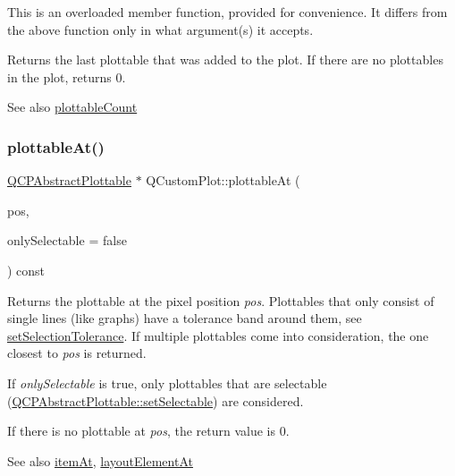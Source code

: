 This is an overloaded member function, provided for convenience. It differs from the above function only in what argument(s) it accepts.

Returns the last plottable that was added to the plot. If there are no plottables in the plot, returns 0.

\begin{DoxySeeAlso}{See also}
\hyperlink{class_q_custom_plot_a5f4f15991c14bf9ad659bb2a19dfbed4}{plottable\+Count} 
\end{DoxySeeAlso}
\mbox{\label{class_q_custom_plot_acddbbd8b16dd633f0d94e5a736fbd8cf}} 
\subsubsection{\texorpdfstring{plottable\+At()}{plottableAt()}}
{\footnotesize\ttfamily \hyperlink{class_q_c_p_abstract_plottable}{Q\+C\+P\+Abstract\+Plottable} $\ast$ Q\+Custom\+Plot\+::plottable\+At (\begin{DoxyParamCaption}\item[{const Q\+PointF \&}]{pos,  }\item[{bool}]{only\+Selectable = {\ttfamily false} }\end{DoxyParamCaption}) const}

Returns the plottable at the pixel position {\itshape pos}. Plottables that only consist of single lines (like graphs) have a tolerance band around them, see \hyperlink{class_q_custom_plot_a4dc31241d7b09680950e19e5f971ed93}{set\+Selection\+Tolerance}. If multiple plottables come into consideration, the one closest to {\itshape pos} is returned.

If {\itshape only\+Selectable} is true, only plottables that are selectable (\hyperlink{class_q_c_p_abstract_plottable_ac238d6e910f976f1f30d41c2bca44ac3}{Q\+C\+P\+Abstract\+Plottable\+::set\+Selectable}) are considered.

If there is no plottable at {\itshape pos}, the return value is 0.

\begin{DoxySeeAlso}{See also}
\hyperlink{class_q_custom_plot_ac08578e0e6c059c83a8d340ba0038e8e}{item\+At}, \hyperlink{class_q_custom_plot_afaa1d304e0287d140fd238e90889ef3c}{layout\+Element\+At} 
\end{DoxySeeAlso}
\mbox{\label{class_q_custom_plot_af5fe78b8bc9e4e96df921612837fd4fd}} 
